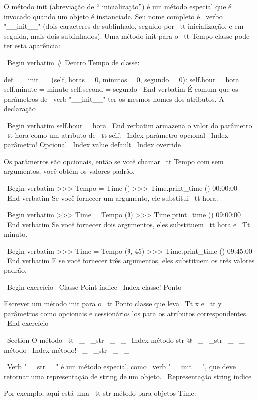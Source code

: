 \documentclass[10pt]{book}
\begin{document}
{{{{{{{{{{{{{{O método init (abreviação de `` inicialização'') é
um método especial que é invocado quando um objeto é instanciado.  
Seu nome completo é \ verbo "__init__" (dois caracteres de sublinhado,
seguido por {\ tt inicialização}, e em seguida, mais dois sublinhados). Uma
método init para o {\ tt} Tempo classe pode ter esta aparência:

\ Begin {verbatim}
# Dentro Tempo de classe:

    def __ init__ (self, horas = 0, minutos = 0, segundo = 0):
        self.hour = hora
        self.minute = minuto
        self.second = segundo
\ End {verbatim}
%
É comum que os parâmetros de \ verb "__init__"
ter os mesmos nomes dos atributos. A declaração

\ Begin {verbatim}
        self.hour = hora
\ End {verbatim}
%
armazena o valor do parâmetro {\ tt hora} como um atributo
de {\ tt self}.
\ Index {parâmetro opcional}
\ Index {parâmetro! Opcional}
\ Index {value default}
\ Index {override}

Os parâmetros são opcionais, então se você chamar {\ tt Tempo} com
sem argumentos, você obtém os valores padrão.

\ Begin {verbatim}
>>> Tempo = Time ()
>>> Time.print_time ()
00:00:00
\ End {verbatim}
%
Se você fornecer um argumento, ele substitui {\ tt hora}:

\ Begin {verbatim}
>>> Time = Tempo (9)
>>> Time.print_time ()
09:00:00
\ End {verbatim}
%
Se você fornecer dois argumentos, eles substituem {\ tt hora} e
{\ Tt minuto}.

\ Begin {verbatim}
>>> Time = Tempo (9, 45)
>>> Time.print_time ()
09:45:00
\ End {verbatim}
%
E se você fornecer três argumentos, eles substituem os três
valores padrão.


\ Begin {} exercício
\ {Classe Point} índice
\ Index {classe! Ponto}

Escrever um método init para o {\ tt Ponto} classe que leva
{\ Tt x} e {\ tt y} parâmetros como opcionais e cessionários
los para os atributos correspondentes.
\ End {} exercício


\ Section {O método {\ tt \ _ \ _str \ _ \ _}}
\ Index {método str @ \ _ \ _str \ _ \ _ método}
\ Index {método! \ _ \ _str \ _ \ _}

\ Verb "__str__" é um método especial, como \ verb "__init__",
que deve retornar uma representação de string de um objeto.
\ {Representação string} índice

Por exemplo, aqui está uma {\ tt str} método para objetos Time:

}}}}}}}}}}}}}}
\end{document}
